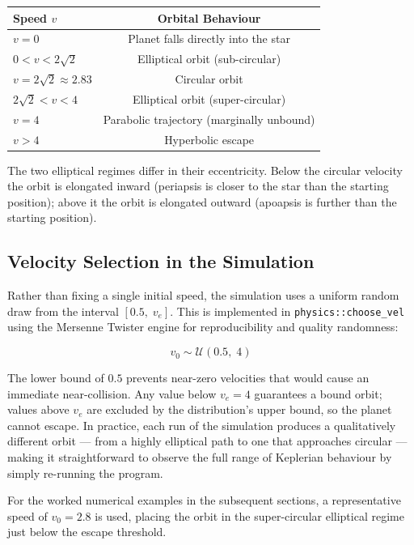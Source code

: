 \begin{center}
\begin{tabular}{l c}
\toprule
Speed $v$ & Orbital Behaviour \\
\midrule
$v = 0$ & Planet falls directly into the star \\
$0 < v < 2\sqrt{2}$ & Elliptical orbit (sub-circular) \\
$v = 2\sqrt{2} \approx 2.83$ & Circular orbit \\
$2\sqrt{2} < v < 4$ & Elliptical orbit (super-circular) \\
$v = 4$ & Parabolic trajectory (marginally unbound) \\
$v > 4$ & Hyperbolic escape \\
\bottomrule
\end{tabular}
\end{center}

\vspace{0.5cm}

The two elliptical regimes differ in their eccentricity. Below the circular velocity the orbit is elongated inward (periapsis is closer to the star than the starting position); above it the orbit is elongated outward (apoapsis is further than the starting position).

\subsection{Velocity Selection in the Simulation}

Rather than fixing a single initial speed, the simulation uses a uniform random draw from the interval $[0.5,\; v_e]$. This is implemented in \texttt{physics::choose\_vel} using the Mersenne Twister engine for reproducibility and quality randomness:

\begin{equation}
v_0 \sim \mathcal{U}(0.5,\; 4)
\end{equation}

The lower bound of $0.5$ prevents near-zero velocities that would cause an immediate near-collision. Any value below $v_e = 4$ guarantees a bound orbit; values above $v_e$ are excluded by the distribution's upper bound, so the planet cannot escape. In practice, each run of the simulation produces a qualitatively different orbit — from a highly elliptical path to one that approaches circular — making it straightforward to observe the full range of Keplerian behaviour by simply re-running the program.

For the worked numerical examples in the subsequent sections, a representative speed of $v_0 = 2.8$ is used, placing the orbit in the super-circular elliptical regime just below the escape threshold.